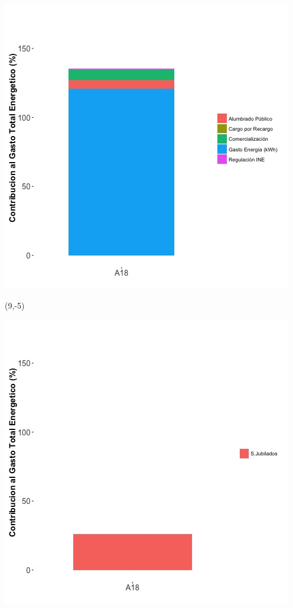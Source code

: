 \documentclass{article}\usepackage[]{graphicx}\usepackage[]{color}
\newenvironment{knitrout}{}{} %
\begin{document}
\begin{knitrout}
\color{fgcolor}
\includegraphics[scale=0.65]{figure/A18_costvars_plot.jpg} 
\end{knitrout}

 \begin{textblock}{1}(9,-5)
\begin{minipage}{20em}
\begingroup

\endgroup
\end{minipage}
\end{textblock}

\begin{knitrout}
\color{fgcolor}
\includegraphics[scale=0.65]{figure/A18_subvars_plot.jpg} 
\end{knitrout}
\end{document}
